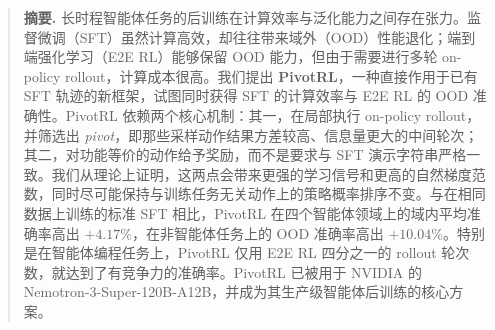 \begin{abstract}
\large \textbf{摘要.}
\normalsize
长时程智能体任务的后训练在计算效率与泛化能力之间存在张力。监督微调（SFT）虽然计算高效，却往往带来域外（OOD）性能退化；端到端强化学习（E2E RL）能够保留 OOD 能力，但由于需要进行多轮 on-policy rollout，计算成本很高。我们提出 \textbf{PivotRL}，一种直接作用于已有 SFT 轨迹的新框架，试图同时获得 SFT 的计算效率与 E2E RL 的 OOD 准确性。PivotRL 依赖两个核心机制：其一，在局部执行 on-policy rollout，并筛选出 \emph{pivot}，即那些采样动作结果方差较高、信息量更大的中间轮次；其二，对功能等价的动作给予奖励，而不是要求与 SFT 演示字符串严格一致。我们从理论上证明，这两点会带来更强的学习信号和更高的自然梯度范数，同时尽可能保持与训练任务无关动作上的策略概率排序不变。与在相同数据上训练的标准 SFT 相比，PivotRL 在四个智能体领域上的域内平均准确率高出 $+4.17\%$，在非智能体任务上的 OOD 准确率高出 $+10.04\%$。特别是在智能体编程任务上，PivotRL 仅用 E2E RL 四分之一的 rollout 轮次数，就达到了有竞争力的准确率。PivotRL 已被用于 NVIDIA 的 Nemotron-3-Super-120B-A12B，并成为其生产级智能体后训练的核心方案。
\end{abstract}
